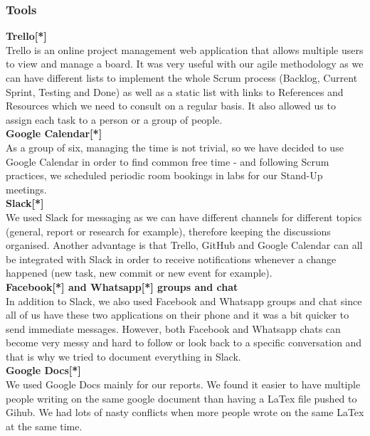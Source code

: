 \documentclass{article}
\begin{document}
\subsubsection{Tools}
\textbf{Trello[*]}\\
Trello is an online project management web application that allows multiple users to view and manage a board. It was very useful with our agile methodology as we can have different lists to implement the whole Scrum process (Backlog, Current Sprint, Testing and Done) as well as a static list with links to References and Resources which we need to consult on a regular basis. It also allowed us to assign each task to a person or a group of people.\\

\textbf{Google Calendar[*]}\\
As a group of six, managing the time is not trivial, so we have decided to use Google Calendar in order to find common free time - and following Scrum practices, we scheduled periodic room bookings in labs for our Stand-Up meetings.\\

\textbf{Slack[*]}\\
We used Slack for messaging as we can have different channels for different topics (general, report or research for example), therefore keeping the discussions organised. Another advantage is that Trello, GitHub and Google Calendar can all be integrated with Slack in order to receive notifications whenever a change happened (new task, new commit or new event for example).\\


\textbf{Facebook[*] and Whatsapp[*] groups and chat}\\
In addition to Slack, we also used Facebook and Whatsapp groups and chat since all of us have these two applications on their phone and it was a bit quicker to send immediate messages. However, both Facebook and Whatsapp chats can become very messy and hard to follow or look back to a specific conversation and that is why we tried to document everything in Slack.\\

\textbf{Google Docs[*]}\\
We used Google Docs mainly for our reports. We found it easier to have multiple people writing on the same google document than having a LaTex file pushed to Gihub. We had lots of nasty conflicts when more people wrote on the same LaTex at the same time. \\
\end{document}
